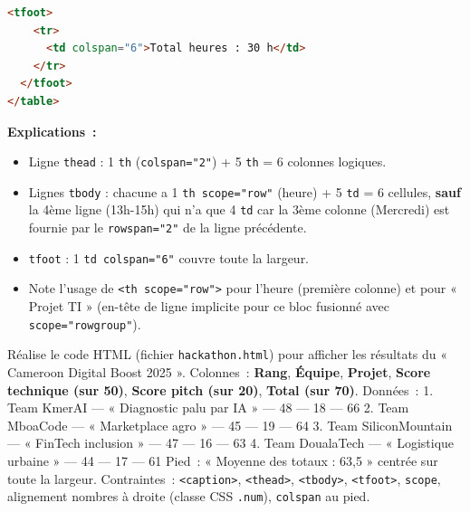 \documentclass[11pt]{article}
\begin{document}
\begin{exoresolu}
\begin{lstlisting}[language=HTML]
  <tfoot>
    <tr>
      <td colspan="6">Total heures : 30 h</td>
    </tr>
  </tfoot>
</table>
\end{lstlisting}

\textbf{Explications~:}
\begin{itemize}
    \item Ligne \texttt{thead} : 1 \texttt{th} (\texttt{colspan="2"}) + 5 \texttt{th} = 6 colonnes logiques.
    \item Lignes \texttt{tbody} : chacune a 1 \texttt{th scope="row"} (heure) + 5 \texttt{td} = 6 cellules, \textbf{sauf} la 4ème ligne (13h-15h) qui n'a que 4 \texttt{td} car la 3ème colonne (Mercredi) est fournie par le \texttt{rowspan="2"} de la ligne précédente.
    \item \texttt{tfoot} : 1 \texttt{td colspan="6"} couvre toute la largeur.
    \item Note l'usage de \texttt{<th scope="row">} pour l'heure (première colonne) et pour « Projet TI » (en-tête de ligne implicite pour ce bloc fusionné avec \texttt{scope="rowgroup"}).
\end{itemize}
\end{exoresolu}

\begin{exercice}
Réalise le code HTML (fichier \texttt{hackathon.html}) pour afficher les résultats du « Cameroon Digital Boost 2025 ».
Colonnes~: \textbf{Rang}, \textbf{Équipe}, \textbf{Projet}, \textbf{Score technique (sur 50)}, \textbf{Score pitch (sur 20)}, \textbf{Total (sur 70)}.
Données~:
1. Team KmerAI — « Diagnostic palu par IA » — 48 — 18 — 66
2. Team MboaCode — « Marketplace agro » — 45 — 19 — 64
3. Team SiliconMountain — « FinTech inclusion » — 47 — 16 — 63
4. Team DoualaTech — « Logistique urbaine » — 44 — 17 — 61
Pied~: « Moyenne des totaux : 63,5 » centrée sur toute la largeur.
Contraintes~: \texttt{<caption>}, \texttt{<thead>}, \texttt{<tbody>}, \texttt{<tfoot>}, \texttt{scope}, alignement nombres à droite (classe CSS \texttt{.num}), \texttt{colspan} au pied.
\end{exercice}
\end{document}
